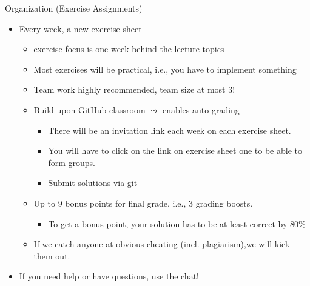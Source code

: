 \documentclass[aspectratio=169]{../latex_main/tntbeamer}  %
\begin{document}
\begin{frame}[c]{Organization (Exercise Assignments)}
	
	\begin{itemize}
	\item Every week, a new exercise sheet
	\begin{itemize}
		\item exercise focus is one week behind the lecture topics
		\item Most exercises will be practical, i.e., you have to implement something
		\item Team work highly recommended, team size at most 3! 
		\pause
		\item Build upon GitHub classroom $\leadsto$ enables auto-grading
		\begin{itemize}
			\item There will be an invitation link each week on each exercise sheet.
			\item You will have to click on the link on exercise sheet one to be able to form groups.
			\item Submit solutions via git
		\end{itemize}
		\pause
		\item Up to \alert{$9$ bonus points} for final grade, i.e., 3 grading boosts.
		\begin{itemize}
		    \item To get a bonus point, your solution has to be at least correct by $80\%$
		\end{itemize}
		\pause
		\item If we catch anyone at obvious cheating (incl. plagiarism),\newline we will kick them out.
	\end{itemize}
	\pause
	\item \alert{If you need help or have questions, use the chat!}
	\end{itemize}
	
\end{frame}
\end{document}
